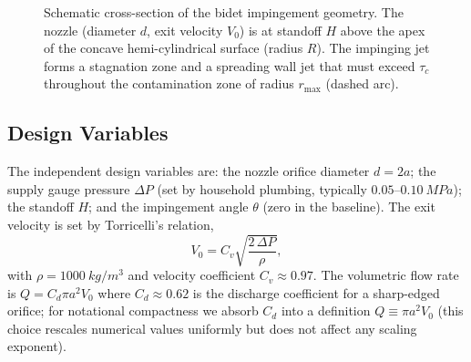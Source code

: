 \documentclass[10pt,letterpaper]{article}
\begin{document}
\begin{figure}[h]
\centering
{}
\caption{Schematic cross-section of the bidet impingement geometry.
The nozzle (diameter $d$, exit velocity $V_0$) is at standoff $H$ above
the apex of the concave hemi-cylindrical surface (radius $R$). The
impinging jet forms a stagnation zone and a spreading wall jet that
must exceed $\tau_c$ throughout the contamination zone of radius
$r_\mathrm{max}$ (dashed arc).}
\label{fig:geometry}
\end{figure}

\subsection{Design Variables}

The independent design variables are: the nozzle orifice diameter
$d = 2a$; the supply gauge pressure $\Delta P$ (set by household plumbing,
typically $0.05$--$0.10~MPa$); the standoff $H$; and the impingement
angle $\theta$ (zero in the baseline). The exit velocity is set by
Torricelli's relation,
\begin{equation}
  V_0 = C_v \sqrt{\frac{2\,\Delta P}{\rho}},
  \label{eq:torricelli}
\end{equation}
with $\rho = 1000~kg/m^3$ and velocity coefficient $C_v \approx 0.97$.
The volumetric flow rate is $Q = C_d \pi a^2 V_0$ where $C_d \approx 0.62$
is the discharge coefficient for a sharp-edged orifice; for notational
compactness we absorb $C_d$ into a definition $Q \equiv \pi a^2 V_0$ (this
choice rescales numerical values uniformly but does not affect any scaling
exponent).
\end{document}
